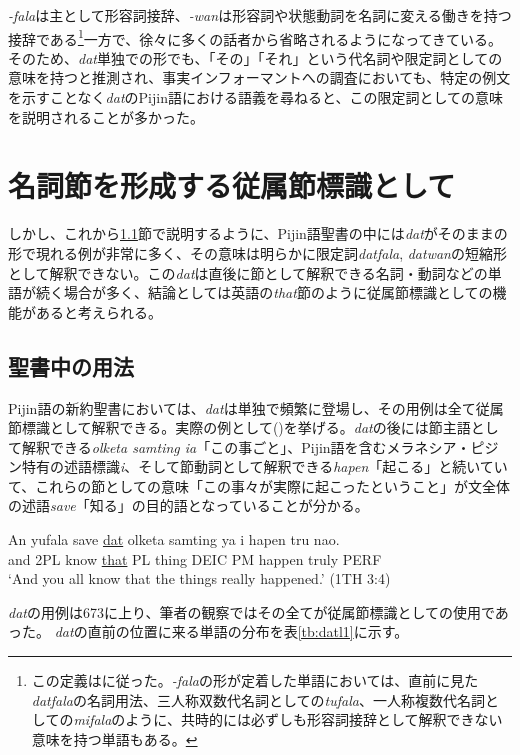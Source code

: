 \textit{-fala}は主として形容詞接辞、\textit{-wan}は形容詞や状態動詞を名詞に変える働きを持つ接辞である\footnote{この定義は\cite{syntax}に従った。\textit{-fala}の形が定着した単語においては、直前に見た\textit{datfala}の名詞用法、三人称双数代名詞としての\textit{tufala}、一人称複数代名詞としての\textit{mifala}のように、共時的には必ずしも形容詞接辞として解釈できない意味を持つ単語もある。}一方で、徐々に多くの話者から省略されるようになってきている\citep{syntax}。
そのため、\textit{dat}単独での形でも、「その」「それ」という代名詞や限定詞としての意味を持つと推測され、事実インフォーマントへの調査においても、特定の例文を示すことなく\textit{dat}のPijin語における語義を尋ねると、この限定詞としての意味を説明されることが多かった。

\section{名詞節を形成する従属節標識として}

しかし、これから\ref{sec:datbib}節で説明するように、Pijin語聖書の中には\textit{dat}がそのままの形で現れる例が非常に多く、その意味は明らかに限定詞\textit{datfala}, \textit{datwan}の短縮形として解釈できない。この\textit{dat}は直後に節として解釈できる名詞・動詞などの単語が続く場合が多く、結論としては英語の\textit{that}節のように従属節標識としての機能があると考えられる。

\subsection{聖書中の用法}\label{sec:datbib}
Pijin語の新約聖書においては、\textit{dat}は単独で頻繁に登場し、その用例は全て従属節標識として解釈できる。実際の例として()を挙げる。\textit{dat}の後には節主語として解釈できる\textit{olketa samting ia}「この事ごと」、Pijin語を含むメラネシア・ピジン特有の述語標識\textit{i}、そして節動詞として解釈できる\textit{hapen}「起こる」と続いていて、これらの節としての意味「この事々が実際に起こったということ」が文全体の述語\textit{save}「知る」の目的語となっていることが分かる。

\begin{exe}
\ex
\gll An yufala save \underline{dat} olketa samting ya i hapen tru nao.\\
and 2PL know \underline{that} PL thing DEIC PM happen truly PERF\\
\glt `And you all know that the things really happened.' (1TH 3:4)
\end{exe}

\textit{dat}の用例は673に上り、筆者の観察ではその全てが従属節標識としての使用であった。
\textit{dat}の直前の位置に来る単語の分布を表\ref{tb:datl1}に示す。

